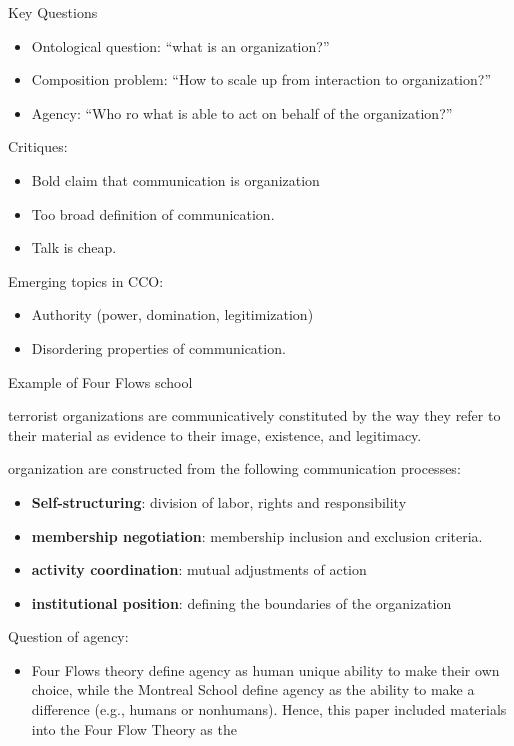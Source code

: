 \documentclass[
]{book}
\providecommand{\tightlist}{%
  \setlength{\itemsep}{0pt}\setlength{\parskip}{0pt}}
\begin{document}
Key Questions

\begin{itemize}
\tightlist
\item
  Ontological question: ``what is an organization?''
\item
  Composition problem: ``How to scale up from interaction to organization?''
\item
  Agency: ``Who ro what is able to act on behalf of the organization?''
\end{itemize}

Critiques:

\begin{itemize}
\tightlist
\item
  Bold claim that communication is organization
\item
  Too broad definition of communication.
\item
  Talk is cheap.
\end{itemize}

Emerging topics in CCO:

\begin{itemize}
\tightlist
\item
  Authority (power, domination, legitimization)
\item
  Disordering properties of communication.
\end{itemize}

\citep{Bruscella_2018}

Example of Four Flows school

terrorist organizations are communicatively constituted by the way they refer to their material as evidence to their
image, existence, and legitimacy.

organization are constructed from the following communication processes:

\begin{itemize}
\tightlist
\item
  \textbf{Self-structuring}: division of labor, rights and responsibility
\item
  \textbf{membership negotiation}: membership inclusion and exclusion criteria.
\item
  \textbf{activity coordination}: mutual adjustments of action
\item
  \textbf{institutional position}: defining the boundaries of the organization
\end{itemize}

Question of agency:

\begin{itemize}
\tightlist
\item
  Four Flows theory define agency as human unique ability to make their own choice, while the Montreal School define
  agency as the ability to make a difference (e.g., humans or nonhumans). Hence, this paper included materials into
  the Four Flow Theory as the
\end{itemize}
\end{document}
